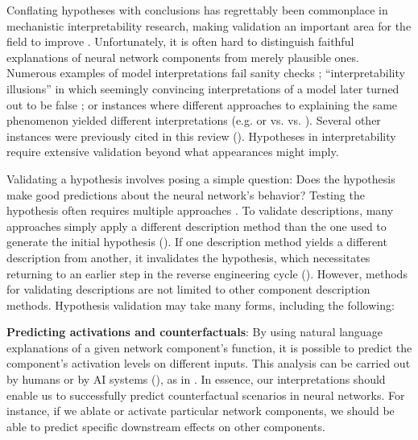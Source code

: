 Conflating hypotheses with conclusions has regrettably been commonplace in mechanistic interpretability research, making validation an important area for the field to improve \citep{madsen2024interpretabilityneedsnewparadigm, stander2024grokkinggroupmultiplicationcosets}. Unfortunately, it is often hard to distinguish faithful explanations of neural network components from merely plausible ones. Numerous examples of model interpretations fail sanity checks \citep{adebayo2020sanitycheckssaliencymaps, leavitt2020falsifiableinterpretabilityresearch, miller2024transformercircuitfaithfulnessmetrics}; “interpretability illusions” in which seemingly convincing interpretations of a model later turned out to be false \citep{bolukbasi2021interpretabilityillusionbert,makelov2023subspacelookingforinterpretability}; or instances where different approaches to explaining the same phenomenon yielded different interpretations (e.g. \citet{Chan_2022_InductionHeads} or \citet{chughtai_2023_toyModel} vs. \citet{stander2024grokkinggroupmultiplicationcosets} vs.  \citet{wu2024unifyingverifyingmechanisticinterpretations}). Several other instances were previously cited in this review (). Hypotheses in interpretability require extensive validation beyond what appearances might imply.

Validating a hypothesis involves posing a simple question: Does the hypothesis make good predictions about the neural network's behavior? Testing the hypothesis often requires multiple approaches \citep{mueller2024questrightmediatorhistory}. To validate descriptions, many approaches simply apply a different description method than the one used to generate the initial hypothesis (). If one description method yields a different description from another, it invalidates the hypothesis, which necessitates returning to an earlier step in the reverse engineering cycle (). However, methods for validating descriptions are not limited to other component description methods. Hypothesis validation may take many forms, including the following:

\textbf{Predicting activations and counterfactuals}: By using natural language explanations of a given network component's function, it is possible to predict the component's activation levels on different inputs. This analysis can be carried out by humans or by AI systems (), as in \citep{hernandez2022natural,bills2023language,shaham2024multimodalautomatedinterpretabilityagent, Belrose_2024_autointerp}. In essence, our interpretations should enable us to successfully predict counterfactual scenarios in neural networks. For instance, if we ablate or activate particular network components, we should be able to predict specific downstream effects on other components.

